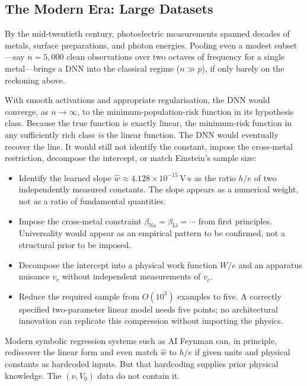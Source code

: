 \documentclass[12pt]{article}
\begin{document}
\subsection{The Modern Era: Large Datasets}

By the mid-twentieth century, photoelectric measurements spanned
decades of metals, surface preparations, and photon energies.
Pooling even a modest subset---say $n=5{,}000$ clean observations
over two octaves of frequency for a single metal---brings a DNN into the
classical regime ($n\gg p$), if only barely on the reckoning above.

With smooth activations and appropriate regularisation, the
DNN would converge, as $n\to\infty$, to the
minimum-population-risk function in its hypothesis class.  Because
the true function is exactly linear, the minimum-risk function in
any sufficiently rich class \emph{is} the linear function.  The
DNN would eventually recover the line.  It would still not identify the
constant, impose the cross-metal restriction, decompose the intercept, or
match Einstein's sample size:
\begin{itemize}
  \item Identify the learned slope $\hat{w} \approx
    4.128\times10^{-15}$\,V$\cdot$s as the ratio $h/e$ of two
    independently measured constants.  The slope appears as a
    numerical weight, not as a ratio of fundamental quantities.
  \item Impose the cross-metal constraint $\beta_{\mathrm{Na}} =
    \beta_{\mathrm{Li}} = \cdots$ from first principles.  Universality
    would appear as an empirical pattern to be confirmed, not a
    structural prior to be imposed.
  \item Decompose the intercept into a physical work function $W/e$
    and an apparatus nuisance $v_c$ without independent
    measurements of $v_c$.
  \item Reduce the required sample from $O(10^3)$ examples to five.
    A correctly specified two-parameter linear model needs five points;
    no architectural innovation can replicate this compression without
    importing the physics.
\end{itemize}

Modern symbolic regression systems such as AI Feynman \citep{Udrescu2020}
can, in principle, rediscover the linear form and even match $\hat{w}$ to
$h/e$ if given units and physical constants as hardcoded inputs.  But
that hardcoding supplies prior physical knowledge.  The $(\nu,V_0)$ data do
not contain it.
\end{document}
